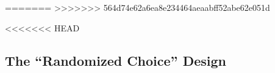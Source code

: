 \documentclass[oneside,11pt]{article}
\begin{document}

=======
>>>>>>> 564d74e62a6ea8e234464aeaabff52abe62e051d



<<<<<<< HEAD
\subsection{The ``Randomized Choice'' Design}
\end{document}
